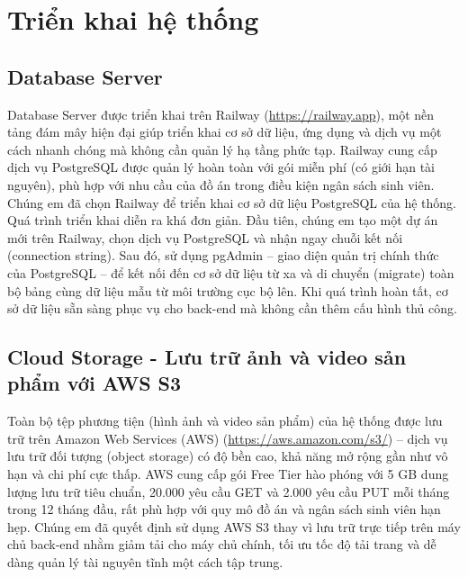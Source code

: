 \section{Triển khai hệ thống}

\subsection{Database Server}
Database Server được triển khai trên Railway (\url{https://railway.app}), một nền tảng đám mây hiện đại giúp triển khai cơ sở dữ liệu, ứng dụng và dịch vụ một cách nhanh chóng mà không cần quản lý hạ tầng phức tạp. Railway cung cấp dịch vụ PostgreSQL được quản lý hoàn toàn với gói miễn phí (có giới hạn tài nguyên), phù hợp với nhu cầu của đồ án trong điều kiện ngân sách sinh viên. Chúng em đã chọn Railway để triển khai cơ sở dữ liệu PostgreSQL của hệ thống. \\

Quá trình triển khai diễn ra khá đơn giản. Đầu tiên, chúng em tạo một dự án mới trên Railway, chọn dịch vụ PostgreSQL và nhận ngay chuỗi kết nối (connection string). Sau đó, sử dụng pgAdmin – giao diện quản trị chính thức của PostgreSQL – để kết nối đến cơ sở dữ liệu từ xa và di chuyển (migrate) toàn bộ bảng cùng dữ liệu mẫu từ môi trường cục bộ lên. Khi quá trình hoàn tất, cơ sở dữ liệu sẵn sàng phục vụ cho back-end mà không cần thêm cấu hình thủ công. \\

\subsection{Cloud Storage - Lưu trữ ảnh và video sản phẩm với AWS S3}

Toàn bộ tệp phương tiện (hình ảnh và video sản phẩm) của hệ thống được lưu trữ trên Amazon Web Services (AWS)  (\url{https://aws.amazon.com/s3/}) – dịch vụ lưu trữ đối tượng (object storage) có độ bền cao, khả năng mở rộng gần như vô hạn và chi phí cực thấp. AWS cung cấp gói Free Tier hào phóng với 5 GB dung lượng lưu trữ tiêu chuẩn, 20.000 yêu cầu GET và 2.000 yêu cầu PUT mỗi tháng trong 12 tháng đầu, rất phù hợp với quy mô đồ án và ngân sách sinh viên hạn hẹp. Chúng em đã quyết định sử dụng AWS S3 thay vì lưu trữ trực tiếp trên máy chủ back-end nhằm giảm tải cho máy chủ chính, tối ưu tốc độ tải trang và dễ dàng quản lý tài nguyên tĩnh một cách tập trung. \\

